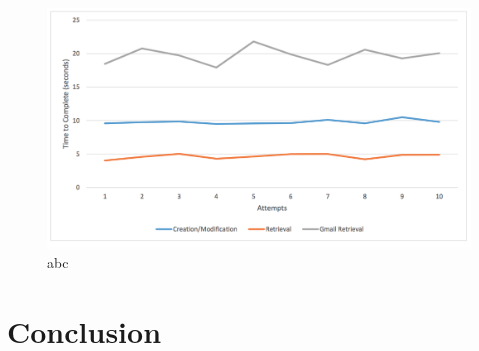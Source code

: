 \begin{figure}[!h]
\begin{centering}
\includegraphics[scale=0.45]{pics/system_performance.png}
\caption{abc}\label{fg:system_performance}
\end{centering}
\end{figure}

\section{Conclusion}
